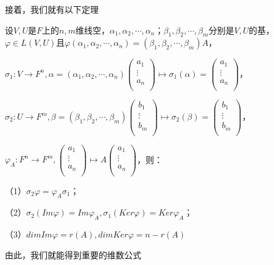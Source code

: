 \documentclass[lang=cn,10pt]{elegantbook}
\begin{document}
	接着，我们就有以下定理
	\begin{theorem}
		设$V,U$是$F$上的$n,m$维线空，$\alpha_1,\alpha_2,\cdots,\alpha_n$；$\beta_1,\beta_2,\cdots,\beta_m$分别是$V,U$的基，$\varphi\in L(V,U)$且$\varphi(\alpha_1,\alpha_2,\cdots,\alpha_n)=(\beta_1,\beta_2,\cdots,\beta_m)A$，
		
		$\sigma_1:V\rightarrow F^n,\alpha=(\alpha_1,\alpha_2,\cdots,\alpha_n)\left(\begin{matrix}a_1\\\vdots\\a_n\\\end{matrix}\right)\mapsto\sigma_1(\alpha)=\left(\begin{matrix}a_1\\\vdots\\a_n\\\end{matrix}\right)$，
		
		$\sigma_2:U\rightarrow F^m,\beta=(\beta_1,\beta_2,\cdots,\beta_m)\left(\begin{matrix}b_1\\\vdots\\b_m\\\end{matrix}\right)\mapsto\sigma_2(\beta)=\left(\begin{matrix}b_1\\\vdots\\b_m\\\end{matrix}\right)$，
		
		$\varphi_A:F^n\rightarrow F^m,\left(\begin{matrix}a_1\\\vdots\\a_n\\\end{matrix}\right)\mapsto A\left(\begin{matrix}a_1\\\vdots\\a_n\\\end{matrix}\right)$，则：
		
		（1）$\sigma_2\varphi=\varphi_A\sigma_1$；
		
		（2）$\sigma_2(Im{\varphi})=Im{\varphi_A},\sigma_1(Ker\varphi)=Ker\varphi_A$；
		
		（3）$dimIm{\varphi}=r(A),dimKer\varphi=n-r(A)$	
	\end{theorem}
	由此，我们就能得到重要的维数公式
\end{document}

